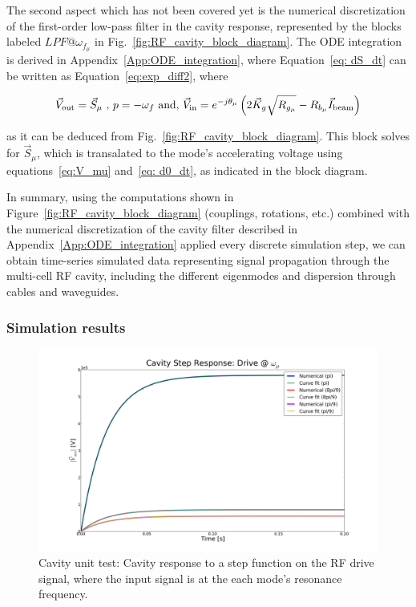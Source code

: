 \documentclass[a4paper,12pt]{article}
\begin{document}
The second aspect which has not been covered yet is the numerical discretization of the first-order low-pass filter in the cavity response, represented by the blocks labeled $LPF@\omega_{f_{\mu}}$ in Fig.~\ref{fig:RF_cavity_block_diagram}. The ODE integration is derived in Appendix~\ref{App:ODE_integration}, where Equation~\ref{eq: dS_dt} can be written as Equation~\ref{eq:exp_diff2}, where

\begin{equation}
 \vec V_{\rm out} = \vec S_{\mu} \mbox{ , } p = -\omega_f \mbox{ and, } \vec V_{\rm in} = e^{-j\theta_{\mu}} \left(2\vec{K}_g\sqrt{R_{g_{\mu}}} - R_{b_{\mu}}\vec{I}_{\rm beam}\right)
\end{equation}

\noindent as it can be deduced from Fig.~\ref{fig:RF_cavity_block_diagram}. This block solves for $\vec S_{\mu}$, which is transalated to the mode's accelerating voltage using equations~\ref{eq:V_mu} and~\ref{eq: d0_dt}, as indicated in the block diagram.

In summary, using the computations shown in Figure~\ref{fig:RF_cavity_block_diagram} (couplings, rotations, etc.) combined with the numerical discretization of the cavity filter described in Appendix~\ref{App:ODE_integration} applied every discrete simulation step, we can obtain time-series simulated data representing signal propagation through the multi-cell RF cavity, including the different eigenmodes and dispersion through cables and waveguides.

\subsubsection{Simulation results}
\label{sec:cav_sim_results}

\begin{figure}
\centering
\includegraphics[scale=0.26]{../figures/cavity_test_drive.png}
\caption{Cavity unit test: Cavity response to a step function on the RF drive signal, where the input signal is at the each mode's resonance frequency.}
\label{fig:cav_step1}
\end{figure}
\end{document}
